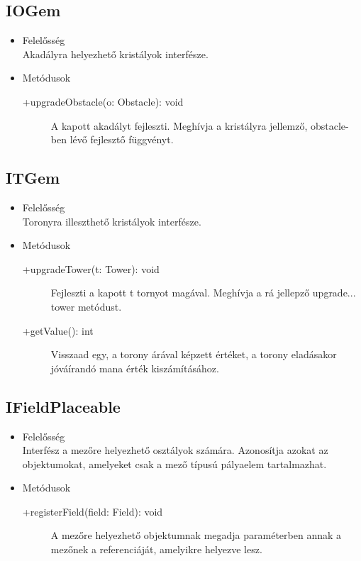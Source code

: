 \subsection{IOGem}
\begin{itemize}
\item Felelősség\\
Akadályra helyezhető kristályok interfésze.

\item Metódusok
	\begin{description}
		\item[+upgradeObstacle(o: Obstacle): void] A kapott akadályt fejleszti. Meghívja a kristályra jellemző, obstacle-ben lévő fejlesztő függvényt. 
		
	\end{description}
\end{itemize}
\subsection{ITGem}
\begin{itemize}
\item Felelősség\\
Toronyra illeszthető kristályok interfésze.

\item Metódusok
	\begin{description}
		\item[+upgradeTower(t: Tower): void] Fejleszti a kapott t tornyot magával. Meghívja a rá jellepző upgrade...  tower metódust. 
\item[+getValue(): int] Visszaad egy, a torony árával képzett értéket, a torony eladásakor jóváírandó mana érték kiszámításához.

		
	\end{description}
\end{itemize}
\subsection{IFieldPlaceable}
\begin{itemize}
\item Felelősség\\
Interfész a mezőre helyezhető osztályok számára. Azonosítja azokat az objektumokat, amelyeket csak a mező típusú pályaelem tartalmazhat.

\item Metódusok
	\begin{description}
		\item[+registerField(field: Field): void] A mezőre helyezhető objektumnak megadja  paraméterben annak a mezőnek a referenciáját, amelyikre helyezve lesz. 


		
	\end{description}
\end{itemize}
